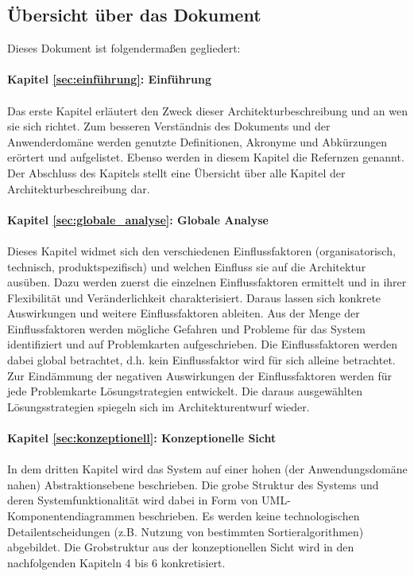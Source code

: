 \subsection{Übersicht über das Dokument}
Dieses Dokument ist folgendermaßen gegliedert:\\
\\
\textbf{Kapitel \ref{sec:einführung}: Einführung} %
\\
\\
{  Das erste Kapitel erläutert den Zweck dieser Architekturbeschreibung und an wen sie sich richtet. Zum besseren Verständnis des Dokuments und der Anwenderdomäne werden genutzte Definitionen, Akronyme und Abkürzungen erörtert und aufgelistet. 
Ebenso werden in diesem Kapitel die Refernzen genannt. Der Abschluss des Kapitels stellt eine Übersicht über alle Kapitel der Architekturbeschreibung dar.}
\\
\\

\textbf{Kapitel \ref{sec:globale_analyse}: Globale Analyse} %
\\
\\
{ Dieses Kapitel widmet sich den verschiedenen Einflussfaktoren (organisatorisch, technisch, produktspezifisch) und welchen Einfluss sie auf die Architektur ausüben. Dazu werden zuerst die einzelnen Einflussfaktoren ermittelt und in ihrer
Flexibilität und Veränderlichkeit charakterisiert. Daraus lassen sich konkrete Auswirkungen und weitere Einflussfaktoren ableiten. Aus der Menge der Einflussfaktoren werden mögliche Gefahren und Probleme für das System identifiziert und auf Problemkarten aufgeschrieben. Die Einflussfaktoren werden dabei global betrachtet, d.h. kein Einflussfaktor wird für sich alleine betrachtet. Zur Eindämmung der negativen Auswirkungen  der Einflussfaktoren werden für jede Problemkarte Lösungstrategien entwickelt. Die daraus ausgewählten Lösungsstrategien spiegeln sich im Architekturentwurf wieder.}
\\
\\

\textbf{Kapitel \ref{sec:konzeptionell}: Konzeptionelle Sicht} %
\\
\\
{In dem dritten Kapitel wird das System auf einer hohen (der Anwendungsdomäne nahen) Abstraktionsebene beschrieben.
Die grobe Struktur des Systems und deren Systemfunktionalität wird dabei in Form von UML-Komponentendiagrammen beschrieben.
Es werden keine technologischen Detailentscheidungen (z.B. Nutzung von bestimmten Sortieralgorithmen) abgebildet.
Die Grobstruktur aus der konzeptionellen Sicht wird in den nachfolgenden Kapiteln 4 bis 6 konkretisiert.}
\\
\\

